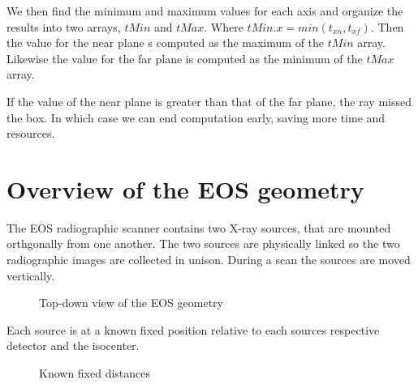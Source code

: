 \documentclass[12pt,twocolumn]{article}
\begin{document}
We then find the minimum and maximum values for each axis and organize the results into two arrays, $tMin$ and $tMax$.
Where $tMin.x = min(t_{xn},t_{xf})$. Then the value for the near plane s computed as the maximum of the
$tMin$ array. Likewise the value for the far plane is computed as the minimum of the $tMax$ array.

If the value of the near plane is greater than that of the far plane, the ray missed the box. In which case we can end
computation early, saving more time and resources. 
\cite{glassnerIntro}

\section{Overview of the EOS\textregistered{} geometry}

The EOS\textregistered{} radiographic scanner contains two X-ray sources, that are mounted orthgonally from one
another. The two sources are physically linked so the two radiographic images are collected in unison. During a 
scan the sources are moved vertically.

\begin{figure}[H]
  \centering

  \caption{Top-down view of the EOS\textregistered{} geometry}
\end{figure}

Each source is at a known fixed position relative to each sources respective detector and the isocenter. 

\begin{figure}[H]
  \centering
  \caption{Known fixed distances}
\end{figure}
\end{document}
